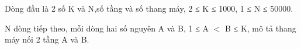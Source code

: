 Dòng đầu là 2 số K và N,số tầng và số thang máy, 2 ≤ K ≤ 1000, 1 ≤ N ≤ 50000.  

   N dòng tiếp theo, mỗi dòng hai số nguyên A và B,  1 ≤ A $<$ B ≤ K, mô tả thang máy nối 2 tầng A và B.  





\